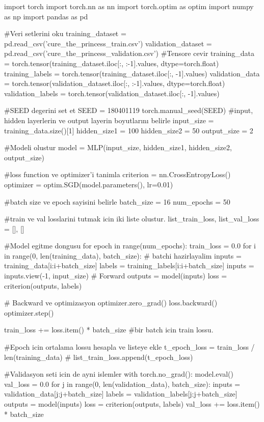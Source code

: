 \documentclass[11pt]{article}
\begin{document}
\begin{python}
import torch
import torch.nn as nn
import torch.optim as optim
import numpy as np
import pandas as pd

#Veri setlerini oku
training_dataset = pd.read_csv('cure_the_princess_train.csv')
validation_dataset = pd.read_csv('cure_the_princess_validation.csv')
#Tensore cevir
training_data = torch.tensor(training_dataset.iloc[:, :-1].values, dtype=torch.float)
training_labels = torch.tensor(training_dataset.iloc[:, -1].values)
validation_data = torch.tensor(validation_dataset.iloc[:, :-1].values, dtype=torch.float)
validation_labels = torch.tensor(validation_dataset.iloc[:, -1].values)

#SEED degerini set et
SEED = 180401119
torch.manual_seed(SEED)
#input, hidden layerlerin ve output layerin boyutlarını belirle
input_size = training_data.size()[1] 
hidden_size1 = 100
hidden_size2 = 50
output_size = 2 

#Modeli olustur
model = MLP(input_size, hidden_size1, hidden_size2, output_size)

#loss function ve optimizer'i tanimla
criterion = nn.CrossEntropyLoss()
optimizer = optim.SGD(model.parameters(), lr=0.01)

#batch size ve epoch sayisini belirle
batch_size = 16
num_epochs = 50

#train ve val losslarini tutmak icin iki liste olustur.
list_train_loss, list_val_loss = [], []

#Model egitme dongusu
for epoch in range(num_epochs):
    train_loss = 0.0
    for i in range(0, len(training_data), batch_size):
        # batchi hazirlayalim
        inputs = training_data[i:i+batch_size]
        labels = training_labels[i:i+batch_size]
        inputs = inputs.view(-1, input_size)
        # Forward 
        outputs = model(inputs)
        loss = criterion(outputs, labels)
        
        # Backward ve optimizasyon
        optimizer.zero_grad()
        loss.backward()
        optimizer.step()
        
        train_loss += loss.item() * batch_size #bir batch icin train lossu.
        
    #Epoch icin ortalama lossu hesapla ve listeye ekle 
    t_epoch_loss = train_loss / len(training_data) #
    list_train_loss.append(t_epoch_loss)
    
#Validasyon seti icin de ayni islemler
    with torch.no_grad():
        model.eval()
        val_loss = 0.0
        for j in range(0, len(validation_data), batch_size):
            inputs = validation_data[j:j+batch_size]
            labels = validation_labels[j:j+batch_size]
            outputs = model(inputs)
            loss = criterion(outputs, labels)
            val_loss += loss.item() * batch_size
            

\end{python}
\end{document}
